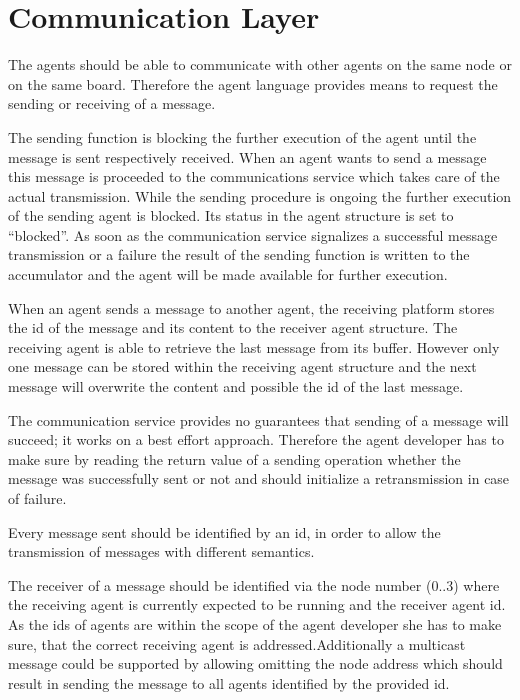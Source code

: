 \documentclass{scrreprt}
\begin{document}
\section{Communication Layer}

The agents should be able to communicate with other agents on the same node or on the same board. Therefore the agent 
language provides means to request the sending or receiving of a message.  


\noindent
The sending function is blocking the further execution of the agent until the message is sent respectively received. 
When an agent wants to send a message this message is proceeded to the communications service which takes care of the 
actual transmission. While the sending procedure is ongoing the further execution of the sending agent is blocked. 
Its status in the agent structure is set to “blocked”. As soon as the communication service signalizes a successful 
message transmission or a failure the result of the sending function is written to the accumulator and the agent will 
be made available for further execution.  


\noindent
When an agent sends a message to another agent, the receiving platform stores the id of the message and its content 
to the receiver agent structure. The receiving agent is able to retrieve the last message from its buffer. 
However only one message can be stored within the receiving agent structure and the next message will overwrite the 
content and possible the id of the last message.  


\noindent
The communication service provides no guarantees that sending of a message will succeed; it works on a best effort 
approach. Therefore the agent developer has to make sure by reading the return value of a sending operation whether 
the message was successfully sent or not and should initialize a retransmission in case of failure. 


\noindent
Every message sent should be identified by an id, in order to allow the transmission of messages with different semantics.

The receiver of a message should be identified via the node number (0..3) where the receiving agent is currently expected
 to be running and the receiver agent id. As the ids of agents are within the scope of the agent developer she has to make 
sure, that the correct receiving agent is addressed.Additionally a multicast message could be supported by allowing omitting 
the node address which should result in sending the message to all agents identified by the provided id. 
\end{document}

